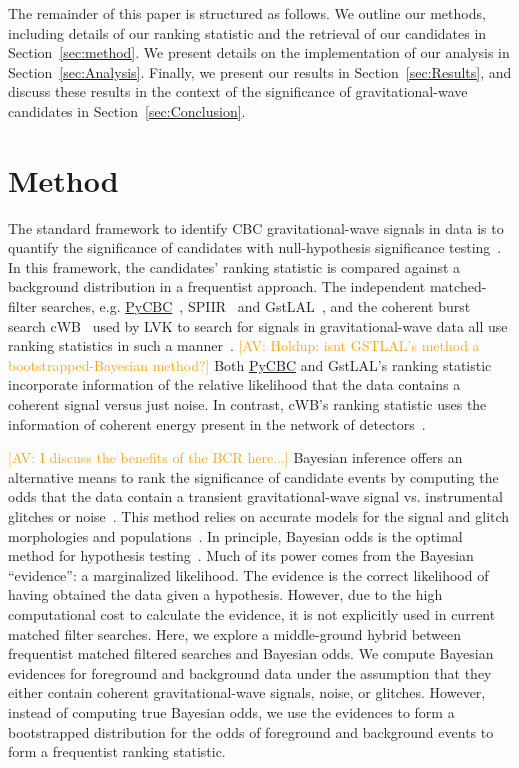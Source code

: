 \documentclass[%
 nofootinbib,
 amsmath,amssymb,
 aps,
 twocolumn,
 superscriptaddress
]{revtex4-2}
\newcommand{\gstlal}{{\sc GstLAL}\xspace}
\newcommand{\cwb}{{\sc cWB}\xspace}
\newcommand{\spiir}{{\sc SPIIR}\xspace}
\newcommand{\pycbc}{{\sc \href{https://pycbc.org/}{{PyCBC}}}\xspace}
\newcommand{\avi}[1]{\textcolor{orange}{[AV: #1]}}
\begin{document}
The remainder of this paper is structured as follows. We outline our methods, including details of our ranking statistic and the retrieval of our candidates in Section~\ref{sec:method}. We present details on the implementation of our analysis in Section~\ref{sec:Analysis}. Finally, we present our results in Section~\ref{sec:Results}, and discuss these results in the context of the significance of gravitational-wave candidates in Section~\ref{sec:Conclusion}.

\section{Method\label{sec:method}}

The standard framework to identify CBC gravitational-wave signals in data is to quantify the significance of candidates with null-hypothesis significance testing~\cite{GWTC1, GWTC2}. In this framework, the candidates' ranking statistic is compared against a background distribution in a frequentist approach. The independent matched-filter searches, e.g. \pycbc~\cite{pycbc_og4}, \spiir~\cite{spiir} and \gstlal~\cite{sachdev2019gstlal}, and the coherent burst search \cwb~\cite{cwb} used by LVK to search for signals in gravitational-wave data all use ranking statistics in such a manner~\cite{GWTC1}. \avi{Holdup: isnt GSTLAL's method a bootstrapped-Bayesian method?} Both \pycbc and \gstlal's ranking statistic incorporate information of the relative likelihood that the data contains a coherent signal versus just noise. In contrast, \cwb's ranking statistic uses the information of coherent energy present in the network of detectors~\cite{GWTC1}. 

\avi{I discuss the benefits of the BCR here...}
Bayesian inference offers an alternative means to rank the significance of candidate events by computing the odds that the data contain a transient gravitational-wave signal vs. instrumental glitches or noise~\cite{BCR1}. This method relies on accurate models for the signal and glitch morphologies and populations~\cite{BCR1}. In principle, Bayesian odds is the optimal method for hypothesis testing~\cite{BCR2}. Much of its power comes from the Bayesian ``evidence'': a marginalized likelihood. The evidence is the correct likelihood of having obtained the data given a hypothesis. However, due to the high computational cost to calculate the evidence, it is not explicitly used in current matched filter searches. Here, we explore a middle-ground hybrid between frequentist matched filtered searches and Bayesian odds. We compute Bayesian evidences for foreground and background data under the assumption that they either contain coherent gravitational-wave signals, noise, or glitches. However, instead of computing true Bayesian odds, we use the evidences to form a bootstrapped distribution for the odds of foreground and background events to form a frequentist ranking statistic.
\end{document}
